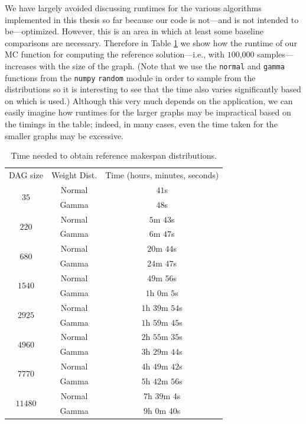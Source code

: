 \documentclass[12pt]{article}
\begin{document}
We have largely avoided discussing runtimes for the various algorithms implemented in this thesis so far because our code is not---and is not intended to be---optimized. However, this is an area in which at least some baseline comparisons are necessary. Therefore in Table \ref{tb.mc_timings} we show how the runtime of our MC function for computing the reference solution---i.e., with $100$,$000$ samples---increases with the size of the graph. (Note that we use the {\tt normal} and {\tt gamma} functions from the {\tt numpy} {\tt random} module in order to sample from the distributions so it is interesting to see that the time also varies significantly based on which is used.) Although this very much depends on the application, we can easily imagine how runtimes for the larger graphs may be impractical based on the timings in the table; indeed, in many cases, even the time taken for the smaller graphs may be excessive. 

\begin{table}
	\caption{Time needed to obtain reference makespan distributions.} 
	\begin{center}	
		\begin{tabular}{c c c}
                  \toprule
                  DAG size & Weight Dist. &  Time (hours, minutes, seconds)\\
                  \cmidrule{1-3}
                  \multirow{2}{*}{$35$} & Normal & $41$s \\
                           & Gamma & $48$s\\
                  \multirow{2}{*}{$220$} & Normal & $5$m $43$s \\
                           & Gamma & $6$m $47$s \\
                  \multirow{2}{*}{$680$} & Normal & $20$m $44$s \\
                  & Gamma &  $24$m $47$s\\
                  \multirow{2}{*}{$1540$} & Normal & $49$m $56$s \\
                           & Gamma & $1$h $0$m $5$s \\
                  \multirow{2}{*}{$2925$} & Normal & $1$h $39$m $54$s \\
                           & Gamma & $1$h $59$m $45$s \\
                  \multirow{2}{*}{$4960$} & Normal & $2$h $55$m $35$s \\
                           & Gamma & $3$h $29$m $44$s \\
                  \multirow{2}{*}{$7770$} & Normal & $4$h $49$m $42$s \\
                           & Gamma & $5$h $42$m $56$s \\
                  \multirow{2}{*}{$11480$} & Normal & $7$h $39$m $4$s \\
                           & Gamma & $9$h $0$m $40$s \\
		\bottomrule
		\end{tabular}
		\label{tb.mc_timings}
	\end{center}	
      \end{table}
\end{document}
